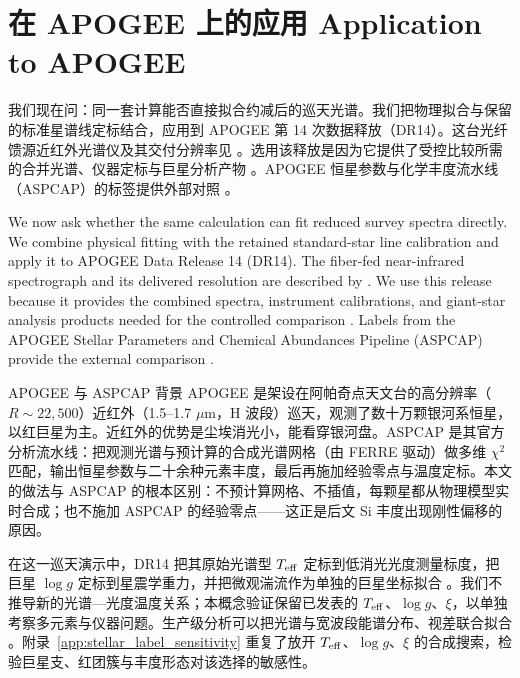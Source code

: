\section{在 APOGEE 上的应用 Application to APOGEE}\label{sec:apogee}

我们现在问：同一套计算能否直接拟合约减后的巡天光谱。我们把物理拟合与保留的标准星谱线定标结合，应用到 APOGEE 第 14 次数据释放（DR14）。这台光纤馈源近红外光谱仪及其交付分辨率见 \citet{Wilson2019}。选用该释放是因为它提供了受控比较所需的合并光谱、仪器定标与巨星分析产物 \citep{Abolfathi2018,Holtzman2018}。APOGEE 恒星参数与化学丰度流水线（ASPCAP）的标签提供外部对照 \citep{GarciaPerez2016,Jonsson2018}。

\begin{EN}
We now ask whether the same calculation can fit reduced survey spectra
directly. We combine physical fitting with the retained standard-star line
calibration and apply it to APOGEE Data Release 14 (DR14).
The fiber-fed near-infrared spectrograph and its delivered resolution are
described by \citet{Wilson2019}. We use this release because it provides the combined spectra, instrument
calibrations, and giant-star analysis products needed for the controlled
comparison \citep{Abolfathi2018,Holtzman2018}. Labels from the APOGEE Stellar
Parameters and Chemical Abundances Pipeline (ASPCAP) provide the
external comparison
\citep{GarciaPerez2016,Jonsson2018}.
\end{EN}

\begin{physbox}{APOGEE 与 ASPCAP 背景}
APOGEE 是架设在阿帕奇点天文台的高分辨率（$R\sim22{,}500$）近红外（1.5--1.7 $\mu$m，H 波段）巡天，观测了数十万颗银河系恒星，以红巨星为主。近红外的优势是尘埃消光小，能看穿银河盘。ASPCAP 是其官方分析流水线：把观测光谱与预计算的合成光谱网格（由 FERRE 驱动）做多维 $\chi^2$ 匹配，输出恒星参数与二十余种元素丰度，最后再施加经验零点与温度定标。本文的做法与 ASPCAP 的根本区别：不预计算网格、不插值，每颗星都从物理模型实时合成；也不施加 ASPCAP 的经验零点——这正是后文 Si 丰度出现刚性偏移的原因。
\end{physbox}

在这一巡天演示中，DR14 把其原始光谱型 $T_{\rm eff}$ 定标到低消光光度测量标度，把巨星 $\log g$ 定标到星震学重力，并把微观湍流作为单独的巨星坐标拟合 \citep{Holtzman2018}。我们不推导新的光谱—光度温度关系；本概念验证保留已发表的 $T_{\rm eff}$、$\log g$、$\xi$，以单独考察多元素与仪器问题。生产级分析可以把光谱与宽波段能谱分布、视差联合拟合 \citep{Cargile2020}。附录~\ref{app:stellar_label_sensitivity} 重复了放开 $T_{\rm eff}$、$\log g$、$\xi$ 的合成搜索，检验巨星支、红团簇与丰度形态对该选择的敏感性。

